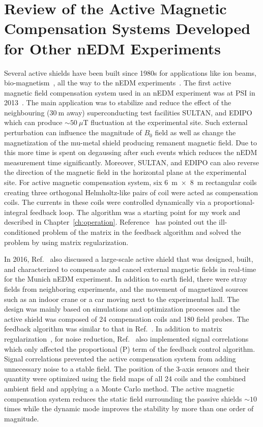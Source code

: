\section{Review of the Active Magnetic Compensation Systems Developed for Other nEDM Experiments}


Several active shields have been built since 1980s for applications like ion beams, bio-magnetism~\cite{active_raw_app_0,active_raw_app_1,active_raw_app_3,active_raw_app_4,active_raw_app_5,active_raw_app_6}, all the way to the nEDM experiments~\cite{bea,lins}. The first active magnetic field compensation system used in an nEDM experiment was at PSI in 2013~\cite{bea}. The main application was to stabilize and reduce the effect of the neighbouring ($\mathrm{30~m}$ away) superconducting test facilities SULTAN, and EDIPO which can produce $\sim50~\mu$T fluctuation at the experimental site. Such external perturbation can influence the magnitude of $B_0$ field as well as change the magnetization of the mu-metal shield producing remanent magnetic field. Due to this more time is spent on degaussing after such events which reduces the nEDM measurement time significantly. Moreover, SULTAN, and EDIPO can also reverse the direction of the magnetic field in the horizontal plane at the experimental site. For active magnetic compensation system, six 6~m~$\times$~8~m rectangular coils creating three orthogonal Helmholtz-like pairs of coil were acted as compensation coils. The currents in these coils were controlled dynamically via a proportional-integral feedback loop. The algorithm was a starting point for my work and described in Chapter~\ref{ch:operation}. Reference~\cite{bea} has pointed out the ill-conditioned problem of the matrix in the feedback algorithm and solved the problem by using matrix regularization.

In 2016, Ref.~\cite{lins} also discussed a large-scale active shield that was designed, built, and characterized to compensate and cancel external magnetic fields in real-time for the Munich nEDM experiment. In addition to earth field, there were stray fields from neighboring experiments, and the movement of magnetized sources such as an indoor crane or a car moving next to the experimental hall. The design was mainly based on simulations and optimization processes and the active shield was composed of 24 compensation coils and 180 field probes. The feedback algorithm was similar to that in Ref.~\cite{bea}. In addition to matrix regularization~\cite{bea}, for noise reduction, Ref.~\cite{lins} also implemented signal correlations which only affected the proportional (P) term of the feedback control algorithm. Signal correlations prevented the active compensation system from adding unnecessary noise to a stable field. The position of the 3-axis sensors and their quantity were optimized using the field maps of all 24 coils and the combined ambient field and applying a a Monte Carlo method. The active magnetic compensation system reduces the static field surrounding the passive shields $\sim10$ times while the dynamic mode improves the stability by more than one order of magnitude.


